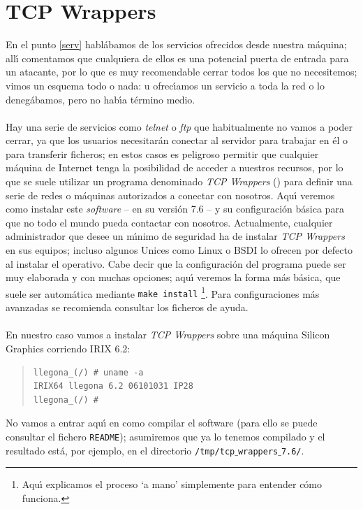 \section{TCP Wrappers}
En el punto \ref{serv} habl\'abamos de los servicios ofrecidos desde nuestra 
m\'aquina; all\'{\i} comentamos que cualquiera de ellos es una potencial puerta 
de entrada para un atacante, por lo que es muy recomendable cerrar todos los
que no necesitemos; vimos un esquema todo o nada: u ofrec\'{\i}amos un servicio
a toda la red o lo deneg\'abamos, pero no hab\'{\i}a t\'ermino medio.\\
\\Hay una serie de servicios como {\it telnet} o {\it ftp} que habitualmente no 
vamos a poder cerrar, ya que los usuarios necesitar\'an conectar al servidor 
para trabajar en \'el o para transferir ficheros; en estos casos es peligroso 
permitir que cualquier m\'aquina de Internet tenga la posibilidad de acceder
a nuestros recursos, por lo que se suele utilizar un programa denominado 
{\it TCP Wrappers} (\cite{kn:ven92}) para definir una serie de redes o 
m\'aquinas autorizados a
conectar con nosotros. Aqu\'{\i} veremos como instalar este {\it software} 
-- en su versi\'on 7.6 -- y su configuraci\'on b\'asica para que no todo el 
mundo pueda contactar con nosotros. Actualmente, cualquier administrador que 
desee un m\'{\i}nimo de seguridad ha de instalar {\it TCP Wrappers} en sus
equipos; incluso algunos Unices como Linux o BSDI lo ofrecen por defecto al 
instalar el operativo. Cabe decir que la configuraci\'on del programa puede
ser muy elaborada y con muchas opciones; aqu\'{\i} veremos la forma m\'as 
b\'asica, que suele ser autom\'atica mediante {\tt make install}
\footnote{Aqu\'{\i} explicamos el proceso `a mano' simplemente para entender 
c\'omo funciona.}. 
Para configuraciones m\'as avanzadas se recomienda consultar los ficheros de 
ayuda.\\
\\En nuestro caso vamos a instalar {\it TCP Wrappers} sobre una m\'aquina
Silicon Graphics corriendo IRIX 6.2:
\tt
\begin{quote}
\begin{verbatim}
llegona_(/) # uname -a
IRIX64 llegona 6.2 06101031 IP28
llegona_(/) # 
\end{verbatim}
\end{quote}
\rm
No vamos a entrar aqu\'{\i} en como compilar el software (para ello se puede
consultar el fichero {\tt README}); asumiremos que ya lo tenemos compilado y
el resultado est\'a, por ejemplo, en el directorio {\tt /tmp/tcp$\_$wrappers$\_$7.6/}.
